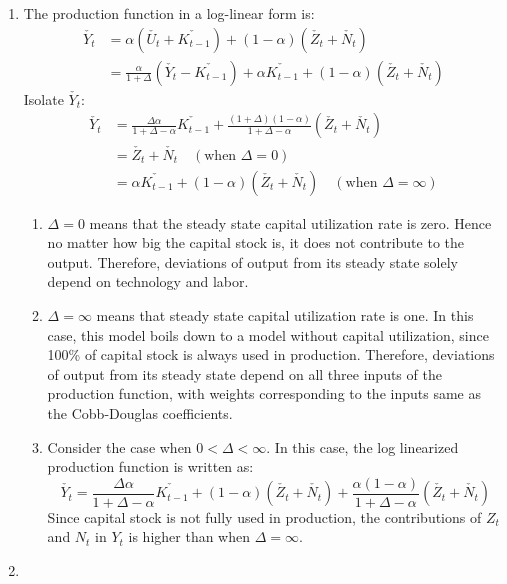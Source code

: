 \documentclass[11pt]{amsart}
\begin{document}
\begin{enumerate}[label=(\alph*)]
	\item The production function in a log-linear form is: 
	\begin{align*}
	\check{Y_t} &= \alpha \left( \check{U_t} + \check{K_{t-1}} \right) + (1-\alpha) \left(  \check{Z_t} + \check{N_t}\right) \\
	& = \frac{\alpha}{1 + \Delta} \left( \check{Y_t} - \check{K_{t-1}} \right) + \alpha \check{K_{t-1}} + (1-\alpha ) \left(  \check{Z_t} + \check{N_t}\right)
	\end{align*} 
	Isolate $\check{Y_t}$:
	\begin{align*}
	\check{Y_t} &= \frac{\Delta \alpha }{1 + \Delta - \alpha} \check{K_{t-1}} + \frac{(1+\Delta)(1-\alpha)}{1+ \Delta - \alpha} \left(  \check{Z_t} + \check{N_t} \right)  \\
	& = \check{Z_t} + \check{N_t} \quad \left( \text{when } \Delta = 0 \right) \\
	& = \alpha \check{K_{t-1}} + (1-\alpha) \left( \check{Z_t } + \check{N_t} \right)   \quad \left( \text{when } \Delta = \infty \right)
	\end{align*}
	\begin{enumerate}[label = (\roman*)]
    \item $\Delta = 0 $ means that the steady state capital utilization rate is zero. Hence no matter how big the capital stock is, it does not contribute to the output. Therefore, deviations of output from its steady state solely depend on technology and labor. 
    
    \item $\Delta = \infty$ means that steady state capital utilization rate is one. In this case, this model boils down to a model without capital utilization, since 100\% of capital stock is always used in production. Therefore, deviations of output from its steady state depend on all three inputs of the production function, with weights corresponding to the inputs same as the Cobb-Douglas coefficients. 
    
    \item Consider the case when $0 < \Delta < \infty$. In this case, the log linearized production function is written as: 
    \begin{equation*}
    \check{Y_t} = \frac{\Delta \alpha }{1 + \Delta - \alpha} \check{K_{t-1}} + (1-\alpha) \left( \check{Z_t} + \check{N_t} \right)+ \frac{\alpha (1-\alpha)}{1+ \Delta - \alpha} \left(  \check{Z_t} + \check{N_t} \right)
    \end{equation*}
    Since capital stock is not fully used in production, the contributions of $Z_t$ and $N_t$ in $Y_t$ is higher than when $\Delta = \infty$. 
    \end{enumerate}
    \item 
\end{enumerate}
\end{document}
